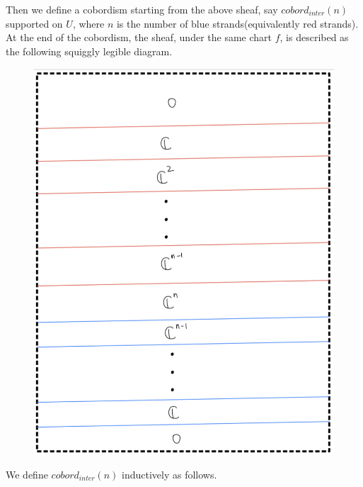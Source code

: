Then we define a cobordism starting from the above sheaf, say $cobord_{inter}(n)$ supported on $U$, where $n$ is the number of blue strands(equivalently red strands). At the end of the cobordism, the sheaf, under the same chart $f$, is described as the following squiggly legible diagram. 
\begin{figure}[H]
    \centering
    \includegraphics[scale = 0.95]{diagrams/cobord_inter/7.png}
    \caption{}
    \label{fig:your-label}
\end{figure} 
\pagebreak
We define $cobord_{inter}(n)$ inductively as follows.
